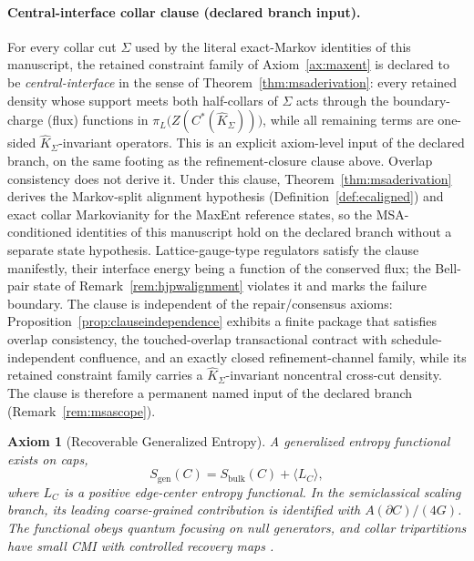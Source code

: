 \documentclass[11pt]{article}
\newtheorem{axiom}[theorem]{Axiom}
\begin{document}
\paragraph{Central-interface collar clause (declared branch input).}\label{par:cicclause}
For every collar cut \(\Sigma\) used by the literal exact-Markov identities of this manuscript, the retained constraint family of Axiom~\ref{ax:maxent} is declared to be \emph{central-interface} in the sense of Theorem~\ref{thm:msaderivation}: every retained density whose support meets both half-collars of \(\Sigma\) acts through the boundary-charge (flux) functions in \(\pi_L\bigl(Z(C^*(\widehat K_\Sigma))\bigr)\), while all remaining terms are one-sided \(\widehat K_\Sigma\)-invariant operators. This is an explicit axiom-level input of the declared branch, on the same footing as the refinement-closure clause above. Overlap consistency does not derive it. Under this clause, Theorem~\ref{thm:msaderivation} derives the Markov-split alignment hypothesis (Definition~\ref{def:ecaligned}) and exact collar Markovianity for the MaxEnt reference states, so the MSA-conditioned identities of this manuscript hold on the declared branch without a separate state hypothesis. Lattice-gauge-type regulators satisfy the clause manifestly, their interface energy being a function of the conserved flux; the Bell-pair state of Remark~\ref{rem:hjpwalignment} violates it and marks the failure boundary. The clause is independent of the repair/consensus axioms: Proposition~\ref{prop:clauseindependence} exhibits a finite package that satisfies overlap consistency, the touched-overlap transactional contract with schedule-independent confluence, and an exactly closed refinement-channel family, while its retained constraint family carries a \(\widehat K_\Sigma\)-invariant noncentral cross-cut density. The clause is therefore a permanent named input of the declared branch (Remark~\ref{rem:msascope}).

\begin{axiom}[Recoverable Generalized Entropy]\label{ax:entropy}
A generalized entropy functional exists on caps,
\[
S_{\mathrm{gen}}(C)=S_{\mathrm{bulk}}(C)+\langle L_C\rangle,
\]
where \(L_C\) is a positive edge-center entropy functional. In the semiclassical scaling branch, its leading coarse-grained contribution is identified with \(A(\partial C)/(4G)\). The functional obeys quantum focusing on null generators, and collar tripartitions have small CMI with controlled recovery maps \cite{liebRuskai73,petz86,petz88,fawziRenner15}.
\end{axiom}
\end{document}

